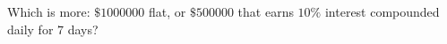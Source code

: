 Which is more: $\$1000000$ flat, or $\$500000$ that earns $10\%$ interest compounded daily for $7$ days?
